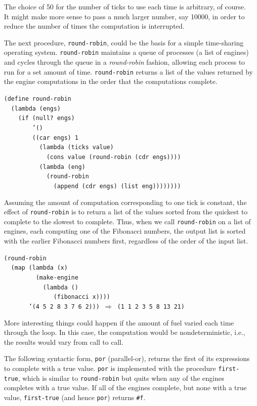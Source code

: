The choice of 50 for the number of ticks to use each time is
arbitrary, of course.
It might make more sense to pass a much larger number, say 10000,
in order to reduce the number of times the computation is interrupted.


The next procedure, \label{examples_s93}\texttt{round-robin}, could be the basis for a simple
time-sharing \label{examples_s94}operating system.
\texttt{round-robin} maintains a queue of processes (a list of engines)
and cycles through the queue in a \textit{round-robin} fashion, allowing each
process to run for a set amount of time.
\texttt{round-robin} returns a list of the values returned by the engine
computations in the order that the computations complete.


\begin{alltt}
(define round-robin
  (lambda (engs)
    (if (null? engs)
        '()
        ((car engs) 1
          (lambda (ticks value)
            (cons value (round-robin (cdr engs))))
          (lambda (eng)
            (round-robin
              (append (cdr engs) (list eng))))))))
\end{alltt}


Assuming the amount of computation corresponding to one tick is constant,
the effect of \texttt{round-robin} is to return a list of the values sorted
from the quickest to complete to the slowest to complete.
Thus, when we call \texttt{round-robin} on a list of engines, each computing
one of the Fibonacci numbers, the output list is sorted with the earlier
Fibonacci numbers first, regardless of the order of the input list.


\begin{alltt}
(round-robin
  (map (lambda (x)
         (make-engine
           (lambda ()
              (fibonacci x))))
       '(4 5 2 8 3 7 6 2))) \(\Rightarrow\) (1 1 2 3 5 8 13 21)
\end{alltt}


More interesting things could happen if the amount of fuel varied
each time through the loop.
\label{examples_s95}In this case, the computation would
be nondeterministic, i.e., the results would vary from call to call.


The following syntactic form, \label{examples_s96}\texttt{por} (parallel-or), returns the
first of its expressions to complete with a true value.
\texttt{por} is implemented with the procedure \texttt{first-true}, which is
similar to \texttt{round-robin} but quits when any of the engines
completes with a true value.
If all of the engines complete, but none with a true value,
\texttt{first-true} (and hence \texttt{por}) returns \texttt{\#{}f}.


